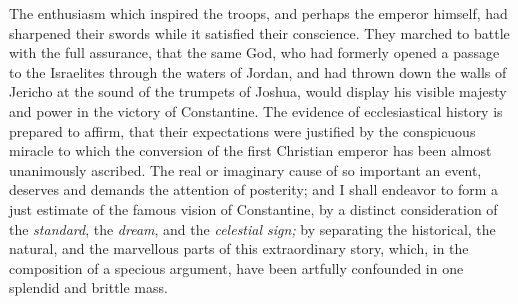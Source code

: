 The enthusiasm which inspired the troops, and perhaps the emperor
himself, had sharpened their swords while it satisfied their
conscience. They marched to battle with the full assurance, that the
same God, who had formerly opened a passage to the Israelites through
the waters of Jordan, and had thrown down the walls of Jericho at the
sound of the trumpets of Joshua, would display his visible majesty and
power in the victory of Constantine. The evidence of ecclesiastical
history is prepared to affirm, that their expectations were justified
by the conspicuous miracle to which the conversion of the first
Christian emperor has been almost unanimously ascribed. The real or
imaginary cause of so important an event, deserves and demands the
attention of posterity; and I shall endeavor to form a just estimate of
the famous vision of Constantine, by a distinct consideration of the
\textit{standard}, the \textit{dream}, and the \textit{celestial sign;} by separating the
historical, the natural, and the marvellous parts of this extraordinary
story, which, in the composition of a specious argument, have been
artfully confounded in one splendid and brittle mass.

